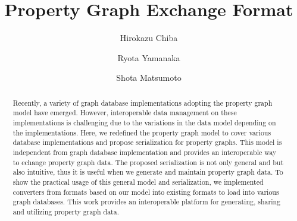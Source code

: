\documentclass[runningheads]{llncs}
\begin{document}
\newtheorem{defi}[theorem]{Definition}
%
\title{Property Graph Exchange Format}
%
%
\author{Hirokazu Chiba \and Ryota Yamanaka \and Shota Matsumoto}
%
%
%
\maketitle              %
%
\begin{abstract}
Recently, a variety of graph database implementations adopting the property graph model have emerged.
However, interoperable data management on these implementations is challenging due to the variations in the data model depending on the implementations.
Here, we redefined the property graph model to cover various database implementations and propose serialization for property graphs. 
This model is independent from graph database implementation and provides an interoperable way to echange property graph data. The proposed serialization is not only general and but also intuitive, thus it is useful when we generate and maintain property graph data. To show the practical usage of this general model and serialization, we implemented converters from formats based on our model into existing formats to load into various graph databases. This work provides an interoperable platform for generating, sharing and utilizing property graph data.
\end{abstract}
\end{document}
